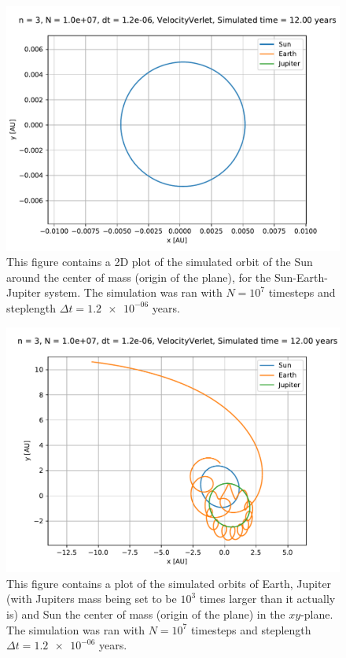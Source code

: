 \documentclass[reprint,english,notitlepage]{revtex4-1}  %
\begin{document}
\begin{figure}[H]
\includegraphics[width=\columnwidth]{../data/figures/sun-earth-jupiter/sej_1xM_vv_orbit2D_COM_zoomed.pdf}
\caption{This figure contains a 2D plot of the simulated orbit of the Sun around the center of mass (origin of the plane), for the Sun-Earth-Jupiter system. The simulation was ran with $N=10^7$ timesteps and steplength $\Delta t = \num{1.2e-06}$ years.}
\label{fig:sej-standard-COM-sun}
\end{figure}

\begin{figure}[H]
\includegraphics[width=\columnwidth]{../data/figures/sun-earth-jupiter/sej_1000xM_vv_orbit2D_COM.pdf}
\caption{This figure contains a plot of the simulated orbits of Earth, Jupiter (with Jupiters mass being set to be $10^3$ times larger than it actually is) and Sun the center of mass (origin of the plane) in the $xy$-plane. The simulation was ran with $N=10^7$ timesteps and steplength $\Delta t = \num{1.2e-06}$ years.}
\label{fig:sej-1000-COM}
\end{figure}
\end{document}
